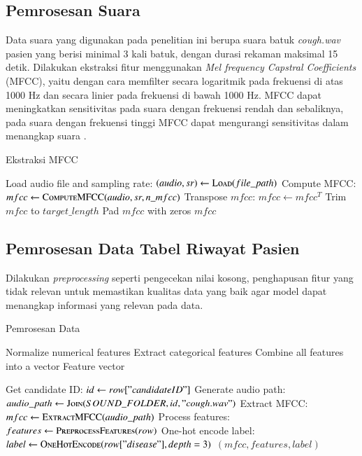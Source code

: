     \subsection{Pemrosesan Suara}
    Data suara yang digunakan pada penelitian ini berupa suara batuk \textit{cough.wav} pasien yang berisi minimal 3 kali batuk, dengan durasi rekaman maksimal 15 detik. Dilakukan ekstraksi fitur menggunakan \textit{Mel frequency Capstral Coefficients} (MFCC), yaitu dengan cara memfilter secara logaritmik pada frekuensi di atas 1000 Hz dan secara linier pada frekuensi di bawah 1000 Hz. MFCC dapat meningkatkan sensitivitas pada suara dengan frekuensi rendah dan sebaliknya, pada suara dengan frekuensi tinggi MFCC dapat mengurangi sensitivitas dalam menangkap suara \cite{10593181}.
    \begin{algorithm}[H]
    \caption{Ekstraksi MFCC}
    \begin{algorithmic}[1]
    
        \State Load audio file and sampling rate: $(audio, sr) \gets \Call{Load}{file\_path}$
        \State Compute MFCC: $mfcc \gets \Call{ComputeMFCC}{audio, sr, n\_mfcc}$
        \State Transpose $mfcc$: $mfcc \gets mfcc^T$
            \State Trim $mfcc$ to $target\_length$
            \State Pad $mfcc$ with zeros
        \EndIf
        \State \Return $mfcc$
    \EndFunction
    
    \end{algorithmic}
    \label{algo:audio_process}
    \end{algorithm}

    \subsection{Pemrosesan Data Tabel Riwayat Pasien}
    Dilakukan \textit{preprocessing} seperti pengecekan nilai kosong, penghapusan fitur yang tidak relevan untuk memastikan kualitas data yang baik agar model dapat menangkap informasi yang relevan pada data.
    \begin{algorithm}[H]
    \caption{Pemrosesan Data}
    \begin{algorithmic}[1]
        \State Normalize numerical features
        \State Extract categorical features
        \State Combine all features into a vector
        \State \Return Feature vector
    \EndFunction
    
        \State Get candidate ID: $id \gets row["candidateID"]$
        \State Generate audio path: $audio\_path \gets \Call{Join}{SOUND\_FOLDER, id, "cough.wav"}$
        \State Extract MFCC: $mfcc \gets \Call{ExtractMFCC}{audio\_path}$
        \State Process features: $features \gets \Call{PreprocessFeatures}{row}$
        \State One-hot encode label: $label \gets \Call{OneHotEncode}{row["disease"], depth=3}$
        \State \Return $(mfcc, features, label)$
    \EndFunction
    \end{algorithmic}
    \label{algo:feature_process}
    \end{algorithm}

